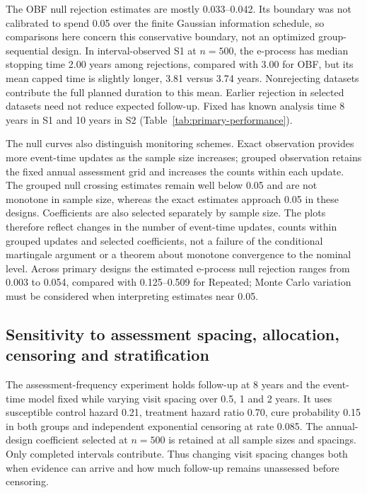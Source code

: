 \documentclass[12pt]{article}
\theoremstyle{definition}
\theoremstyle{remark}
\begin{document}
The OBF null rejection estimates are mostly 0.033--0.042. Its boundary was not calibrated to spend 0.05 over the finite Gaussian information schedule, so comparisons here concern this conservative boundary, not an optimized group-sequential design. In interval-observed S1 at $n=500$, the e-process has median stopping time 2.00 years among rejections, compared with 3.00 for OBF, but its mean capped time is slightly longer, 3.81 versus 3.74 years. Nonrejecting datasets contribute the full planned duration to this mean. Earlier rejection in selected datasets need not reduce expected follow-up. Fixed has known analysis time 8 years in S1 and 10 years in S2 (Table~\ref{tab:primary-performance}).

\begin{samepage}
The null curves also distinguish monitoring schemes. Exact observation provides more event-time updates as the sample size increases; grouped observation retains the fixed annual assessment grid and increases the counts within each update. The grouped null crossing estimates remain well below 0.05 and are not monotone in sample size, whereas the exact estimates approach 0.05 in these designs. Coefficients are also selected separately by sample size. The plots therefore reflect changes in the number of event-time updates, counts within grouped updates and selected coefficients, not a failure of the conditional martingale argument or a theorem about monotone convergence to the nominal level. Across primary designs the estimated e-process null rejection ranges from 0.003 to 0.054, compared with 0.125--0.509 for Repeated; Monte Carlo variation must be considered when interpreting estimates near 0.05.
\par\end{samepage}

\subsection{Sensitivity to assessment spacing, allocation, censoring and stratification}
\label{sec:observation-sensitivity}

The assessment-frequency experiment holds follow-up at 8 years and the event-time model fixed while varying visit spacing over 0.5, 1 and 2 years. It uses susceptible control hazard 0.21, treatment hazard ratio 0.70, cure probability 0.15 in both groups and independent exponential censoring at rate 0.085. The annual-design coefficient selected at $n=500$ is retained at all sample sizes and spacings. Only completed intervals contribute. Thus changing visit spacing changes both when evidence can arrive and how much follow-up remains unassessed before censoring.
\end{document}
